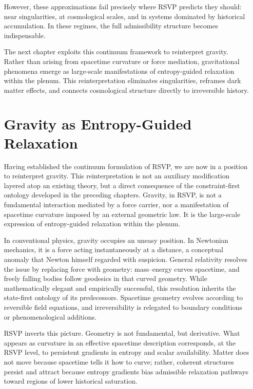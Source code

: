 \documentclass[11pt,oneside]{book}
\begin{document}
However, these approximations fail precisely where RSVP predicts they should: near singularities, at cosmological scales, and in systems dominated by historical accumulation. In these regimes, the full admissibility structure becomes indispensable.

The next chapter exploits this continuum framework to reinterpret gravity. Rather than arising from spacetime curvature or force mediation, gravitational phenomena emerge as large-scale manifestations of entropy-guided relaxation within the plenum. This reinterpretation eliminates singularities, reframes dark matter effects, and connects cosmological structure directly to irreversible history.

\chapter{Gravity as Entropy-Guided Relaxation}

Having established the continuum formulation of RSVP, we are now in a position to reinterpret gravity. This reinterpretation is not an auxiliary modification layered atop an existing theory, but a direct consequence of the constraint-first ontology developed in the preceding chapters. Gravity, in RSVP, is not a fundamental interaction mediated by a force carrier, nor a manifestation of spacetime curvature imposed by an external geometric law. It is the large-scale expression of entropy-guided relaxation within the plenum.

In conventional physics, gravity occupies an uneasy position. In Newtonian mechanics, it is a force acting instantaneously at a distance, a conceptual anomaly that Newton himself regarded with suspicion. General relativity resolves the issue by replacing force with geometry: mass–energy curves spacetime, and freely falling bodies follow geodesics in that curved geometry. While mathematically elegant and empirically successful, this resolution inherits the state-first ontology of its predecessors. Spacetime geometry evolves according to reversible field equations, and irreversibility is relegated to boundary conditions or phenomenological additions.

RSVP inverts this picture. Geometry is not fundamental, but derivative. What appears as curvature in an effective spacetime description corresponds, at the RSVP level, to persistent gradients in entropy and scalar availability. Matter does not move because spacetime tells it how to curve; rather, coherent structures persist and attract because entropy gradients bias admissible relaxation pathways toward regions of lower historical saturation.
\end{document}
